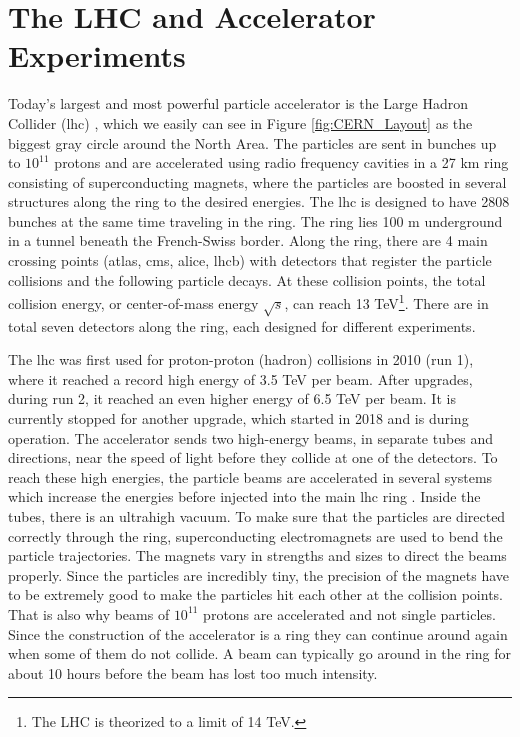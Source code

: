 \documentclass[a4paper, american, 12pt]{report}
\begin{document}

	\section{The LHC and Accelerator Experiments}
	\label{sect:Theory-LHC}
	Today's largest and most powerful particle accelerator is the Large Hadron Collider (\acrshort{lhc}) \cite{LHCatCERN}, which we easily can see in Figure \ref{fig:CERN_Layout} as the biggest gray circle around the North Area. The particles are sent in bunches up to $10^{11}$ protons and are accelerated using radio frequency cavities in a 27 km ring consisting of superconducting magnets, where the particles are boosted in several structures along the ring to the desired energies. The \acrshort{lhc} is designed to have 2808 bunches at the same time traveling in the ring. The ring lies 100 m underground in a tunnel beneath the French-Swiss border. Along the ring, there are 4 main crossing points (\acrshort{atlas}, \acrshort{cms}, \acrshort{alice}, \acrshort{lhcb}) with detectors that register the particle collisions and the following particle decays. At these collision points, the total collision energy, or center-of-mass energy $\sqrt{s}$, can reach 13 TeV\footnote{The LHC is theorized to a limit of 14 TeV.}. There are in total seven detectors along the ring, each designed for different experiments.
	
	The \acrshort{lhc} was first used for proton-proton (hadron) collisions in 2010 (run 1), where it reached a record high energy of 3.5 TeV per beam. After upgrades, during run 2, it reached an even higher energy of 6.5 TeV per beam. It is currently stopped for another upgrade, which started in 2018 and is during operation. The accelerator sends two high-energy beams, in separate tubes and directions, near the speed of light before they collide at one of the detectors. To reach these high energies, the particle beams are accelerated in several systems which increase the energies before injected into the main \acrshort{lhc} ring \cite{AccatCERN}. Inside the tubes, there is an ultrahigh vacuum. To make sure that the particles are directed correctly through the ring, superconducting electromagnets are used to bend the particle trajectories. The magnets vary in strengths and sizes to direct the beams properly. Since the particles are incredibly tiny, the precision of the magnets have to be extremely good to make the particles hit each other at the collision points. That is also why beams of $10^{11}$ protons are accelerated and not single particles. Since the construction of the accelerator is a ring they can continue around again when some of them do not collide. A beam can typically go around in the ring for about 10 hours before the beam has lost too much intensity.
	
\end{document}
